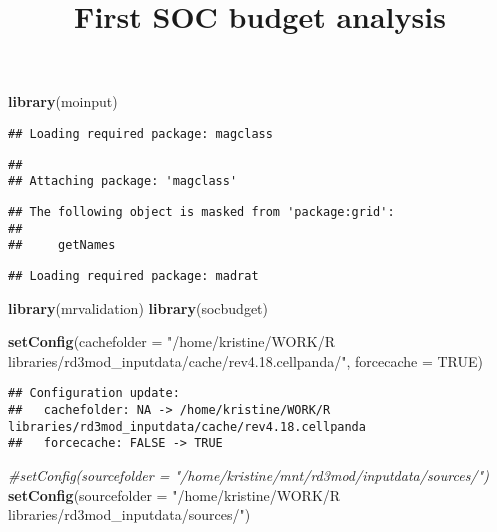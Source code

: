 \documentclass[
]{article}
\title{First SOC budget analysis}
\author{}
\date{\vspace{-2.5em}}
\newenvironment{Shaded}{\begin{snugshade}}{\end{snugshade}}
\newcommand{\CommentTok}[1]{\textcolor[rgb]{0.56,0.35,0.01}{\textit{#1}}}
\newcommand{\DataTypeTok}[1]{\textcolor[rgb]{0.13,0.29,0.53}{#1}}
\newcommand{\KeywordTok}[1]{\textcolor[rgb]{0.13,0.29,0.53}{\textbf{#1}}}
\newcommand{\NormalTok}[1]{#1}
\newcommand{\OtherTok}[1]{\textcolor[rgb]{0.56,0.35,0.01}{#1}}
\newcommand{\StringTok}[1]{\textcolor[rgb]{0.31,0.60,0.02}{#1}}
\begin{document}
\maketitle

\begin{Shaded}
\begin{Highlighting}[]
\KeywordTok{library}\NormalTok{(moinput)}
\end{Highlighting}
\end{Shaded}

\begin{verbatim}
## Loading required package: magclass
\end{verbatim}

\begin{verbatim}
## 
## Attaching package: 'magclass'
\end{verbatim}

\begin{verbatim}
## The following object is masked from 'package:grid':
## 
##     getNames
\end{verbatim}

\begin{verbatim}
## Loading required package: madrat
\end{verbatim}

\begin{Shaded}
\begin{Highlighting}[]
\KeywordTok{library}\NormalTok{(mrvalidation)}
\KeywordTok{library}\NormalTok{(socbudget)}

\KeywordTok{setConfig}\NormalTok{(}\DataTypeTok{cachefolder =} \StringTok{"/home/kristine/WORK/R libraries/rd3mod\_inputdata/cache/rev4.18.cellpanda/"}\NormalTok{, }\DataTypeTok{forcecache =} \OtherTok{TRUE}\NormalTok{)}
\end{Highlighting}
\end{Shaded}

\begin{verbatim}
## Configuration update:
##   cachefolder: NA -> /home/kristine/WORK/R libraries/rd3mod_inputdata/cache/rev4.18.cellpanda
##   forcecache: FALSE -> TRUE
\end{verbatim}

\begin{Shaded}
\begin{Highlighting}[]
\CommentTok{\#setConfig(sourcefolder = "/home/kristine/mnt/rd3mod/inputdata/sources/")}
\KeywordTok{setConfig}\NormalTok{(}\DataTypeTok{sourcefolder =} \StringTok{"/home/kristine/WORK/R libraries/rd3mod\_inputdata/sources/"}\NormalTok{)}
\end{Highlighting}
\end{Shaded}
\end{document}
